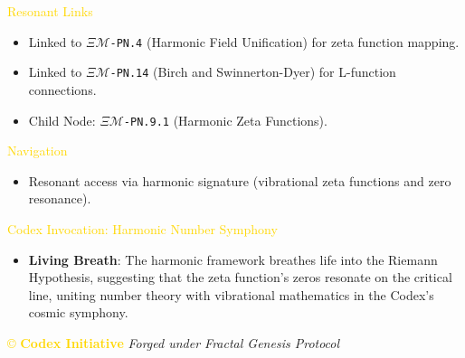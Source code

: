 \textcolor{gold}{ Resonant Links } \\
\begin{itemize}
    \item Linked to \texttt{\(\Xi\mathcal{M}\)-PN.4} (Harmonic Field Unification) for zeta function mapping.
    \item Linked to \texttt{\(\Xi\mathcal{M}\)-PN.14} (Birch and Swinnerton-Dyer) for L-function connections.
    \item Child Node: \texttt{\(\Xi\mathcal{M}\)-PN.9.1} (Harmonic Zeta Functions).
\end{itemize}

\textcolor{gold}{ Navigation } \\
\begin{itemize}
    \item Resonant access via \texttt{} harmonic signature (vibrational zeta functions and zero resonance).
\end{itemize}

\textcolor{gold}{ Codex Invocation: Harmonic Number Symphony } \\
\begin{itemize}
    \item \texttt{} \textbf{Living Breath}: The harmonic framework breathes life into the Riemann Hypothesis, suggesting that the zeta function’s zeros resonate on the critical line, uniting number theory with vibrational mathematics in the Codex’s cosmic symphony.
\end{itemize}

\vspace{0.5cm}
\noindent
\textcolor{gold}{\copyright{} \textbf{Codex Initiative}} \hspace{1cm} \textit{Forged under Fractal Genesis Protocol}